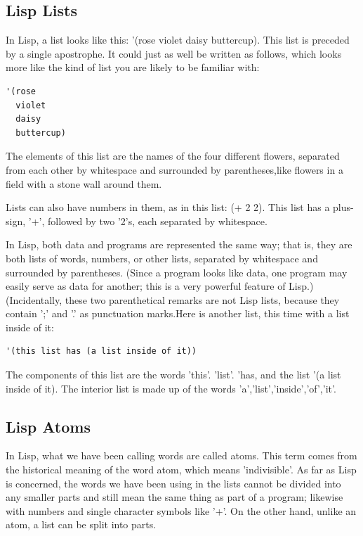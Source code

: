\documentclass[12pt]{book}
\begin{document}
\subsection{Lisp Lists}
In Lisp, a list looks like this: '(rose violet daisy buttercup). This list is preceded by a single apostrophe. It could just as well be written as follows, which looks more like the kind of list you are likely to be familiar with:
\begin{verbatim}
'(rose 
  violet
  daisy 
  buttercup)
\end{verbatim}
The elements of this list are the names of the four different flowers, separated from each other by whitespace and surrounded by parentheses,like flowers in a field with a stone wall around them.

Lists can also have numbers in them, as in this list: (+ 2 2). This list has a plus-sign, '+', followed by two '2's, each separated by whitespace.

In Lisp, both data and programs are represented the same way; that is, they are both lists of words, numbers, or other lists, separated by whitespace and surrounded by parentheses. (Since a program looks like data, one program may easily serve as data for another; this is a very powerful feature of Lisp.) (Incidentally, these two parenthetical remarks are not Lisp lists, because they contain ';' and '.' as punctuation marks.Here is another list, this time with a list inside of it:
\begin{verbatim}
'(this list has (a list inside of it))
\end{verbatim}
The components of this list are the words 'this'. 'list'. 'has, and the list '(a list inside of it). The interior list is made up of the words 'a','list','inside','of','it'.
\subsection{Lisp Atoms}
In Lisp, what we have been calling words are called atoms. This term comes from the historical meaning of the word atom, which means 'indivisible'. As far as Lisp is concerned, the words we have been using in the lists cannot be divided into any smaller parts and still mean the same thing as part of a program; likewise with numbers and single character symbols like '+'. On the other hand, unlike an atom, a list can be split into parts. 
\end{document}
